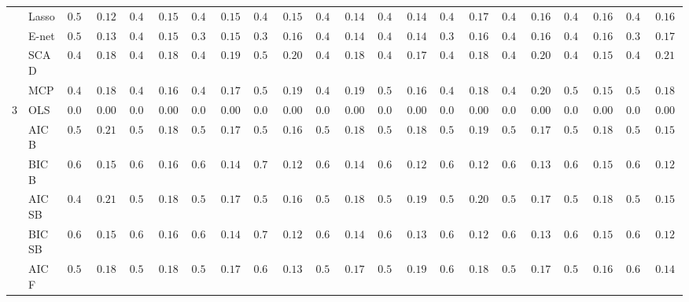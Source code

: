 \begin{tabular}{p{0.2cm}p{1cm}|p{0.6cm}p{0.6cm}|p{0.6cm}p{0.6cm}p{0.6cm}p{0.6cm}p{0.6cm}p{0.6cm}|p{0.6cm}p{0.6cm}p{0.6cm}p{0.6cm}p{0.6cm}p{0.6cm}|p{0.6cm}p{0.6cm}p{0.6cm}p{0.6cm}p{0.6cm}p{0.6cm}}
 & Lasso  & $0.512$ & $0.1249$ & $0.476$ & $0.1525$ & $0.430$ & $0.1541$ & $0.412$ & $0.1552$ & $0.490$ & $0.1432$ & $0.478$ & $0.1418$ & $0.420$ & $0.1717$ & $0.476$ & $0.1628$ & $0.454$ & $0.1629$ & $0.428$ & $0.1682$ \\
 & E-net  & $0.500$ & $0.1348$ & $0.462$ & $0.1575$ & $0.396$ & $0.1504$ & $0.324$ & $0.1628$ & $0.476$ & $0.1498$ & $0.460$ & $0.1435$ & $0.352$ & $0.1611$ & $0.464$ & $0.1630$ & $0.434$ & $0.1609$ & $0.372$ & $0.1776$ \\
 & SCAD  & $0.410$ & $0.1872$ & $0.424$ & $0.1870$ & $0.434$ & $0.1908$ & $0.548$ & $0.2082$ & $0.416$ & $0.1879$ & $0.478$ & $0.1727$ & $0.492$ & $0.1830$ & $0.416$ & $0.2063$ & $0.496$ & $0.1595$ & $0.472$ & $0.2118$ \\
 & MCP  & $0.450$ & $0.1829$ & $0.496$ & $0.1669$ & $0.474$ & $0.1790$ & $0.542$ & $0.1996$ & $0.460$ & $0.1959$ & $0.512$ & $0.1641$ & $0.470$ & $0.1829$ & $0.464$ & $0.2087$ & $0.524$ & $0.1525$ & $0.512$ & $0.1849$ \\\hline
3 & OLS  & $0.000$ & $0.0000$ & $0.000$ & $0.0000$ & $0.000$ & $0.0000$ & $0.000$ & $0.0000$ & $0.000$ & $0.0000$ & $0.000$ & $0.0000$ & $0.000$ & $0.0000$ & $0.000$ & $0.0000$ & $0.000$ & $0.0000$ & $0.000$ & $0.0000$ \\
 & AIC B  & $0.500$ & $0.2118$ & $0.524$ & $0.1881$ & $0.546$ & $0.1702$ & $0.598$ & $0.1645$ & $0.538$ & $0.1857$ & $0.560$ & $0.1886$ & $0.550$ & $0.1977$ & $0.572$ & $0.1753$ & $0.542$ & $0.1827$ & $0.582$ & $0.1559$ \\
 & BIC B  & $0.658$ & $0.1512$ & $0.634$ & $0.1609$ & $0.656$ & $0.1479$ & $0.702$ & $0.1223$ & $0.686$ & $0.1429$ & $0.694$ & $0.1286$ & $0.666$ & $0.1241$ & $0.682$ & $0.1306$ & $0.658$ & $0.1590$ & $0.668$ & $0.1278$ \\
 & AIC SB  & $0.498$ & $0.2118$ & $0.524$ & $0.1881$ & $0.546$ & $0.1702$ & $0.598$ & $0.1645$ & $0.538$ & $0.1857$ & $0.558$ & $0.1913$ & $0.548$ & $0.2002$ & $0.570$ & $0.1761$ & $0.538$ & $0.1813$ & $0.582$ & $0.1559$ \\
 & BIC SB  & $0.658$ & $0.1512$ & $0.634$ & $0.1609$ & $0.652$ & $0.1494$ & $0.700$ & $0.1223$ & $0.690$ & $0.1403$ & $0.690$ & $0.1314$ & $0.666$ & $0.1273$ & $0.682$ & $0.1306$ & $0.658$ & $0.1590$ & $0.668$ & $0.1278$ \\
 & AIC F  & $0.532$ & $0.1825$ & $0.554$ & $0.1839$ & $0.574$ & $0.1721$ & $0.648$ & $0.1396$ & $0.564$ & $0.1761$ & $0.584$ & $0.1900$ & $0.606$ & $0.1830$ & $0.596$ & $0.1752$ & $0.584$ & $0.1600$ & $0.660$ & $0.1463$ \\

\end{tabular}
